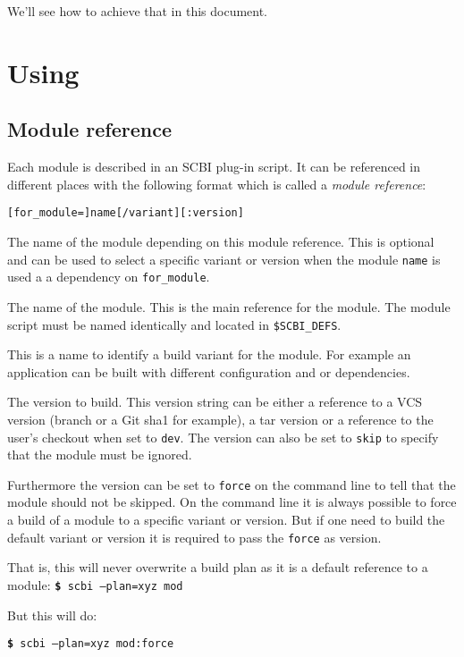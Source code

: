 \documentclass[a4paper,12pt,twoside]{article}
\newcommand{\code}[1]{\texttt{#1}}
\renewcommand{\emph}[1]{\textit{#1}}
\newcommand{\cmd}[1]{\tabto{1cm}\hspace{0.5cm}\texttt{\textbf{\$} #1}}
\let\stdsection\section
\renewcommand\section{\newpage\stdsection}
\begin{document}
We'll see how to achieve that in this document.


\section{Using}

\subsection{Module reference}
\label{modref}

Each module is described in an SCBI plug-in script. It can be referenced in different places with the following format which is called a \emph{module reference}:

\code{[for\_module=]name[/variant][:version]}
\label{dev}

\begin{description}[style=nextline]
	\item[for\_module] The name of the module depending on this module reference. This is optional and can be used to select a specific variant or version when the module \code{name} is used a a dependency on \code{for\_module}.

	\item[name] The name of the module. This is the main reference for the module. The module script must be named identically and located in \code{\$SCBI\_DEFS}.

	\item[variant] \label{variant}This is a name to identify a build variant for the module. For example an application can be built with different configuration and or dependencies.

	\item[version] The version to build. This version string can be either a reference to a VCS version (branch or a Git sha1 for example), a tar version or a reference to the user's checkout when set to \code{dev}. The version can also be set to \code{skip} to specify that the module must be ignored.

	Furthermore the version can be set to \code{force} on the command line to tell that the module should not be skipped. On the command line it is always possible to force a build of a module to a specific variant or version. But if one need to build the default variant or version it is required to pass the \code{force} as version.

	That is, this will never overwrite a build plan as it is a default reference to a module:
	\cmd{scbi --plan=xyz mod}

	But this will do:

	\cmd{scbi --plan=xyz mod:force}
\end{description}
\end{document}
